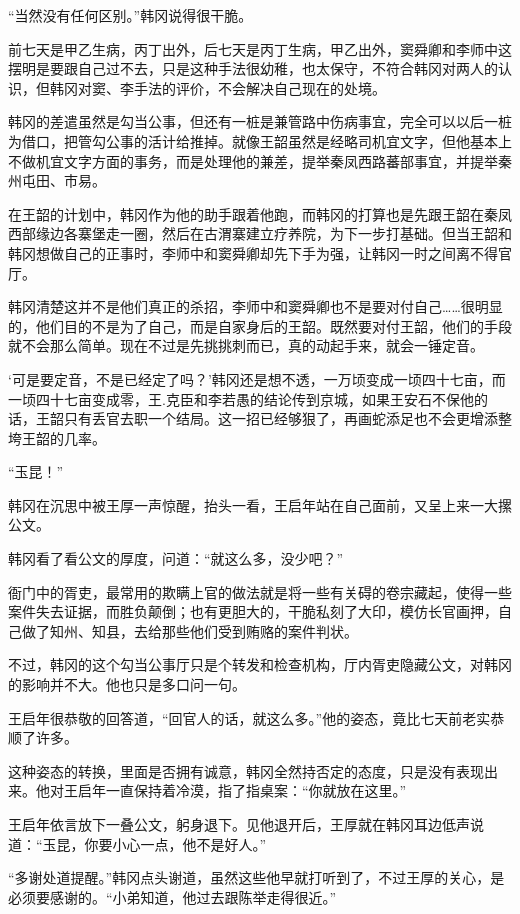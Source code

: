 “当然没有任何区别。”韩冈说得很干脆。

前七天是甲乙生病，丙丁出外，后七天是丙丁生病，甲乙出外，窦舜卿和李师中这摆明是要跟自己过不去，只是这种手法很幼稚，也太保守，不符合韩冈对两人的认识，但韩冈对窦、李手法的评价，不会解决自己现在的处境。

韩冈的差遣虽然是勾当公事，但还有一桩是兼管路中伤病事宜，完全可以以后一桩为借口，把管勾公事的活计给推掉。就像王韶虽然是经略司机宜文字，但他基本上不做机宜文字方面的事务，而是处理他的兼差，提举秦凤西路蕃部事宜，并提举秦州屯田、市易。

在王韶的计划中，韩冈作为他的助手跟着他跑，而韩冈的打算也是先跟王韶在秦凤西部缘边各寨堡走一圈，然后在古渭寨建立疗养院，为下一步打基础。但当王韶和韩冈想做自己的正事时，李师中和窦舜卿却先下手为强，让韩冈一时之间离不得官厅。

韩冈清楚这并不是他们真正的杀招，李师中和窦舜卿也不是要对付自己……很明显的，他们目的不是为了自己，而是自家身后的王韶。既然要对付王韶，他们的手段就不会那么简单。现在不过是先挑挑刺而已，真的动起手来，就会一锤定音。

‘可是要定音，不是已经定了吗？’韩冈还是想不透，一万顷变成一顷四十七亩，而一顷四十七亩变成零，王.克臣和李若愚的结论传到京城，如果王安石不保他的话，王韶只有丢官去职一个结局。这一招已经够狠了，再画蛇添足也不会更增添整垮王韶的几率。

“玉昆！”

韩冈在沉思中被王厚一声惊醒，抬头一看，王启年站在自己面前，又呈上来一大摞公文。

韩冈看了看公文的厚度，问道：“就这么多，没少吧？”

衙门中的胥吏，最常用的欺瞒上官的做法就是将一些有关碍的卷宗藏起，使得一些案件失去证据，而胜负颠倒；也有更胆大的，干脆私刻了大印，模仿长官画押，自己做了知州、知县，去给那些他们受到贿赂的案件判状。

不过，韩冈的这个勾当公事厅只是个转发和检查机构，厅内胥吏隐藏公文，对韩冈的影响并不大。他也只是多口问一句。

王启年很恭敬的回答道，“回官人的话，就这么多。”他的姿态，竟比七天前老实恭顺了许多。

这种姿态的转换，里面是否拥有诚意，韩冈全然持否定的态度，只是没有表现出来。他对王启年一直保持着冷漠，指了指桌案：“你就放在这里。”

王启年依言放下一叠公文，躬身退下。见他退开后，王厚就在韩冈耳边低声说道：“玉昆，你要小心一点，他不是好人。”

“多谢处道提醒。”韩冈点头谢道，虽然这些他早就打听到了，不过王厚的关心，是必须要感谢的。“小弟知道，他过去跟陈举走得很近。”

